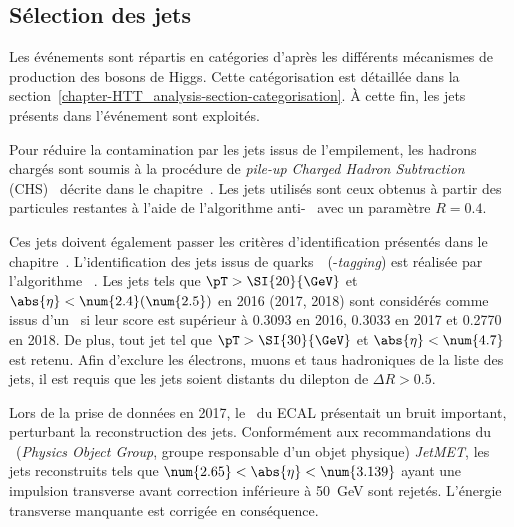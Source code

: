 \subsection{Sélection des jets}\label{chapter-HTT_analysis-section-jets}
Les événements sont répartis en catégories d'après les différents mécanismes de production des bosons de Higgs.
Cette catégorisation est détaillée dans la section~\ref{chapter-HTT_analysis-section-categorisation}.
À cette fin, les jets présents dans l'événement sont exploités.
\par
Pour réduire la contamination par les jets issus de l'empilement, les hadrons chargés sont soumis à la procédure de \emph{pile-up Charged Hadron Subtraction} (CHS)~\cite{CMS-PAS-JME-14-001} décrite dans le chapitre~.
Les jets utilisés sont ceux obtenus à partir des particules restantes à l'aide de l'algorithme anti-\kT~\cite{Cacciari_antikT} avec un paramètre $R=\num{0.4}$.
\par
Ces jets doivent également passer les critères d'identification présentés dans le chapitre~.
L'identification des jets issus de quarks~\quarkb\ (\quarkb-\emph{tagging}) est réalisée par l'algorithme \DeepCSV~\cite{Sirunyan_heavy_flavor_jets_2018,DeepJet}.
Les jets tels que $\pT > \SI{20}{\GeV}$ et $\abs{\eta}<\num{2.4} (\num{2.5})$ en 2016 (2017, 2018) sont considérés comme issus d'un \quarkb\ si leur score est supérieur à \num{0.3093} en 2016, \num{0.3033} en 2017 et \num{0.2770} en 2018.
De plus, tout jet tel que $\pT > \SI{30}{\GeV}$ et $\abs{\eta}<\num{4.7}$ est retenu.
Afin d'exclure les électrons, muons et taus hadroniques de la liste des jets, il est requis que les jets soient distants du dilepton de $\Delta R > \num{0.5}$.
\par
Lors de la prise de données en 2017, le \CMSendcap\ du ECAL présentait un bruit important, perturbant la reconstruction des jets.
Conformément aux recommandations du \POG\ (\emph{Physics Object Group}, groupe responsable d'un objet physique) \emph{JetMET}, les jets reconstruits tels que $\num{2.65} < \abs{\eta} < \num{3.139}$ ayant une impulsion transverse avant correction inférieure à \SI{50}{\GeV} sont rejetés.
L'énergie transverse manquante est corrigée en conséquence.